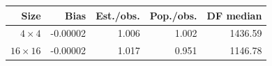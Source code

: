 \begin{tabular}{@{}rrrrr@{}}\toprule
Size & Bias & Est./obs. & Pop./obs. & DF median\\\midrule
\(4\times4\) & -0.00002 & 1.006 & 1.002 & 1436.59\\
\(16\times16\) & -0.00002 & 1.017 & 0.951 & 1146.78\\
\bottomrule\end{tabular}
